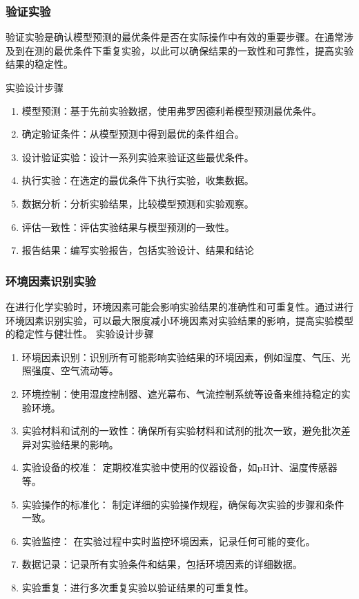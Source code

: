 \documentclass[AutoFakeBold]{ctexart}
\begin{document}
	\subsubsection{验证实验}
	
	验证实验是确认模型预测的最优条件是否在实际操作中有效的重要步骤。在通常涉及到在测的最优条件下重复实验，以此可以确保结果的一致性和可靠性，提高实验结果的稳定性。
	
	实验设计步骤
	
	\begin{enumerate}
		\item 模型预测：基于先前实验数据，使用弗罗因德利希模型预测最优条件。
		\item 确定验证条件：从模型预测中得到最优的条件组合。
		\item 设计验证实验：设计一系列实验来验证这些最优条件。
		\item 执行实验：在选定的最优条件下执行实验，收集数据。
		\item  数据分析：分析实验结果，比较模型预测和实验观察。
		\item  评估一致性：评估实验结果与模型预测的一致性。
		\item  报告结果：编写实验报告，包括实验设计、结果和结论
	\end{enumerate}
	
	\subsubsection{环境因素识别实验}
	
	在进行化学实验时，环境因素可能会影响实验结果的准确性和可重复性。通过进行环境因素识别实验，可以最大限度减小环境因素对实验结果的影响，提高实验模型的稳定性与健壮性。
	实验设计步骤
	
	\begin{enumerate}
		\item 环境因素识别：识别所有可能影响实验结果的环境因素，例如湿度、气压、光照强度、空气流动等。
		\item 环境控制：使用湿度控制器、遮光幕布、气流控制系统等设备来维持稳定的实验环境。
		\item 实验材料和试剂的一致性：确保所有实验材料和试剂的批次一致，避免批次差异对实验结果的影响。
		\item 实验设备的校准：
		定期校准实验中使用的仪器设备，如pH计、温度传感器等。
		\item  实验操作的标准化：
		制定详细的实验操作规程，确保每次实验的步骤和条件一致。
		\item  实验监控：
		在实验过程中实时监控环境因素，记录任何可能的变化。
		\item  数据记录：记录所有实验条件和结果，包括环境因素的详细数据。
		\item  实验重复：进行多次重复实验以验证结果的可重复性。
	\end{enumerate}
	
\end{document}
